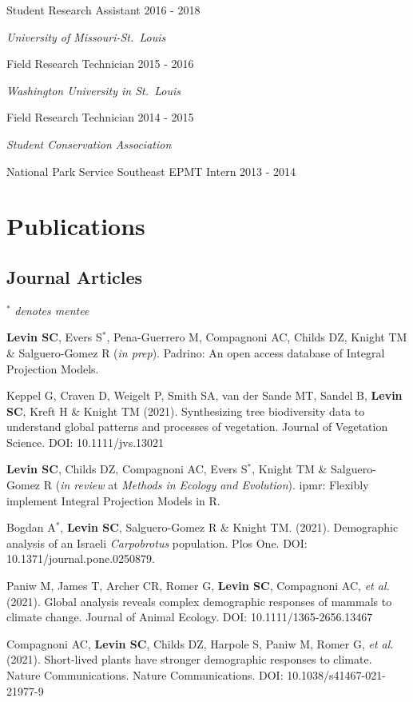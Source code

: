 \documentclass[11pt,]{article}
\begin{document}
Student Research Assistant \hfill 2016 - 2018

\emph{University of Missouri-St.~Louis}

Field Research Technician \hfill 2015 - 2016

\emph{Washington University in St.~Louis}

Field Research Technician \hfill 2014 - 2015

\emph{Student Conservation Association}

National Park Service Southeast EPMT Intern \hfill 2013 - 2014

\hypertarget{publications}{%
\section{Publications}\label{publications}}

\hypertarget{journal-articles}{%
\subsection{Journal Articles}\label{journal-articles}}

\(^\ast\) \emph{denotes mentee}

\textbf{Levin SC}, Evers S\(^\ast\), Pena-Guerrero M, Compagnoni AC,
Childs DZ, Knight TM \& Salguero-Gomez R (\emph{in prep}). Padrino: An
open access database of Integral Projection Models.

Keppel G, Craven D, Weigelt P, Smith SA, van der Sande MT, Sandel B,
\textbf{Levin SC}, Kreft H \& Knight TM (2021). Synthesizing tree
biodiversity data to understand global patterns and processes of
vegetation. Journal of Vegetation Science. DOI: 10.1111/jvs.13021

\textbf{Levin SC}, Childs DZ, Compagnoni AC, Evers S\(^\ast\), Knight TM
\& Salguero-Gomez R (\emph{in review} at \emph{Methods in Ecology and
Evolution}). ipmr: Flexibly implement Integral Projection Models in R.

Bogdan A\(^\ast\), \textbf{Levin SC}, Salguero-Gomez R \& Knight TM.
(2021). Demographic analysis of an Israeli \emph{Carpobrotus}
population. Plos One. DOI: 10.1371/journal.pone.0250879.

Paniw M, James T, Archer CR, Romer G, \textbf{Levin SC}, Compagnoni AC,
\emph{et al.} (2021). Global analysis reveals complex demographic
responses of mammals to climate change. Journal of Animal Ecology. DOI:
10.1111/1365-2656.13467

Compagnoni AC, \textbf{Levin SC}, Childs DZ, Harpole S, Paniw M, Romer
G, \emph{et al.} (2021). Short-lived plants have stronger demographic
responses to climate. Nature Communications. Nature Communications. DOI:
10.1038/s41467-021-21977-9
\end{document}
